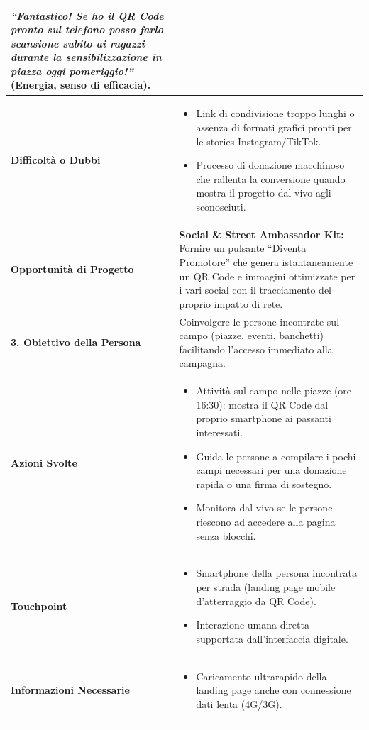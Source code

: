 \documentclass[11pt,a4paper]{article}
\begin{document}
\begin{table}[h!]
\begin{tabular}{|p{3.2cm}|p{11.8cm}|}
\textit{``Fantastico! Se ho il QR Code pronto sul telefono posso farlo scansione subito ai ragazzi durante la sensibilizzazione in piazza oggi pomeriggio!''} (Energia, senso di efficacia). \\ \hline
\textbf{Difficoltà o Dubbi} &
\begin{itemize}[leftmargin=*,nosep]
    \item Link di condivisione troppo lunghi o assenza di formati grafici pronti per le stories Instagram/TikTok.
    \item Processo di donazione macchinoso che rallenta la conversione quando mostra il progetto dal vivo agli sconosciuti.
\end{itemize} \\ \hline
\textbf{Opportunità di Progetto} &
\textbf{Social \& Street Ambassador Kit:} Fornire un pulsante ``Diventa Promotore'' che genera istantaneamente un QR Code e immagini ottimizzate per i vari social con il tracciamento del proprio impatto di rete. \\ \hline
\hline
\textbf{3. Obiettivo della Persona} & Coinvolgere le persone incontrate sul campo (piazze, eventi, banchetti) facilitando l'accesso immediato alla campagna. \\ \hline
\textbf{Azioni Svolte} &
\begin{itemize}[leftmargin=*,nosep]
    \item Attività sul campo nelle piazze (ore 16:30): mostra il QR Code dal proprio smartphone ai passanti interessati.
    \item Guida le persone a compilare i pochi campi necessari per una donazione rapida o una firma di sostegno.
    \item Monitora dal vivo se le persone riescono ad accedere alla pagina senza blocchi.
\end{itemize} \\ \hline
\textbf{Touchpoint} &
\begin{itemize}[leftmargin=*,nosep]
    \item Smartphone della persona incontrata per strada (landing page mobile d'atterraggio da QR Code).
    \item Interazione umana diretta supportata dall'interfaccia digitale.
\end{itemize} \\ \hline
\textbf{Informazioni Necessarie} &
\begin{itemize}[leftmargin=*,nosep]
    \item Caricamento ultrarapido della landing page anche con connessione dati lenta (4G/3G).

\end{itemize}
\end{tabular}
\end{table}
\end{document}

